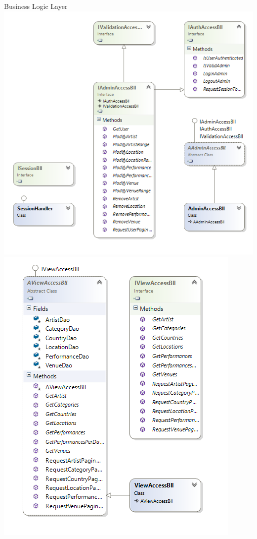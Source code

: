 \begin{section}{Business Logic Layer}
\includegraphics[angle=0, scale=0.45]{./img/blladminaccess.PNG}
\FloatBarrier
\includegraphics[angle=0, scale=0.45]{./img/bllviewaccess.PNG}
\FloatBarrier


\end{section}
